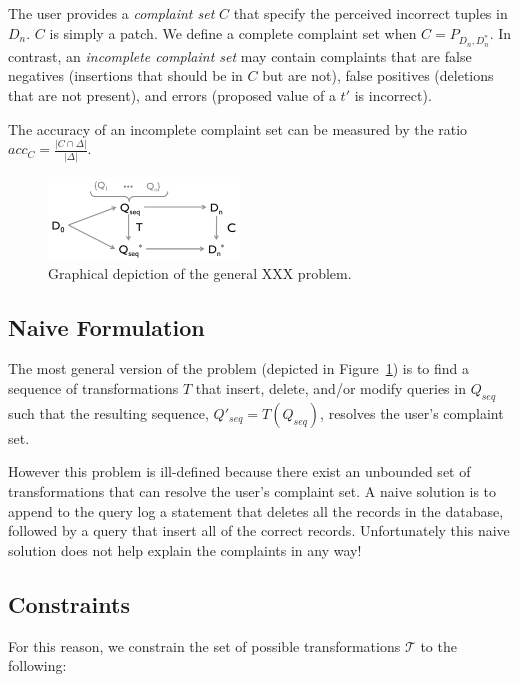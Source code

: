 The user provides a {\it complaint set} $C$ that specify the perceived incorrect tuples in $D_n$.
$C$ is simply a patch.
We define a complete complaint set when $C = P_{D_n, D^*_n}$.
In contrast, an {\it incomplete complaint set}  may contain complaints that are false negatives (insertions that should be in $C$ but are not),
false positives (deletions that are not present), and errors (proposed value of a $t'$ is incorrect).

The accuracy of an incomplete complaint set can be measured by the ratio $acc_C = \frac{|C \cap \Delta|}{|\Delta|}$.



\begin{figure}[h]
\centering
\includegraphics[width = 2in]{figures/probtransform}
\caption{Graphical depiction of the general XXX problem.}
\label{f:probtransform} 
\end{figure}



\subsection{Naive Formulation}

The most general version of the problem
(depicted in Figure~\ref{f:probtransform}) is to find a sequence of
transformations $T$ that insert, delete, and/or modify queries in $Q_{seq}$ 
such that the resulting sequence, $Q'_{seq} = T(Q_{seq})$, resolves the user's complaint set. 

However this problem is ill-defined because there exist an unbounded set of transformations that
can resolve the user's complaint set.  A naive solution is to append to the query log a statement
that deletes all the records in the database, followed by a query that insert all of the correct records.
Unfortunately this naive solution does not help explain the complaints in any way!

\subsection{Constraints}

For this reason, we constrain the set of possible transformations $\mathcal{T}$ to the following:

